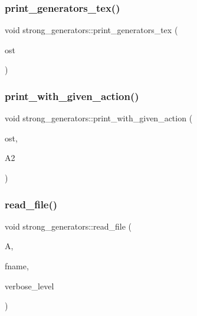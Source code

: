 \mbox{\label{classstrong__generators_ae4d81315ba881e7adb846b079fa9f0d8}} 
\subsubsection{\texorpdfstring{print\+\_\+generators\+\_\+tex()}{print\_generators\_tex()}\hspace{0.1cm}{\footnotesize\ttfamily [2/2]}}
{\footnotesize\ttfamily void strong\+\_\+generators\+::print\+\_\+generators\+\_\+tex (\begin{DoxyParamCaption}\item[{ostream \&}]{ost }\end{DoxyParamCaption})}

\mbox{\label{classstrong__generators_a6f470676cb12740c515471ed98e7f0de}} 
\subsubsection{\texorpdfstring{print\+\_\+with\+\_\+given\+\_\+action()}{print\_with\_given\_action()}}
{\footnotesize\ttfamily void strong\+\_\+generators\+::print\+\_\+with\+\_\+given\+\_\+action (\begin{DoxyParamCaption}\item[{ostream \&}]{ost,  }\item[{\mbox{\hyperlink{classaction}{action}} $\ast$}]{A2 }\end{DoxyParamCaption})}

\mbox{\label{classstrong__generators_ab051e503d66f5287ea59d5bf2e75fa3b}} 
\subsubsection{\texorpdfstring{read\+\_\+file()}{read\_file()}}
{\footnotesize\ttfamily void strong\+\_\+generators\+::read\+\_\+file (\begin{DoxyParamCaption}\item[{\mbox{\hyperlink{classaction}{action}} $\ast$}]{A,  }\item[{const \mbox{\hyperlink{galois_8h_ab6cc7b4aeb6ea31aba2b3fbfc83ff5e6}{B\+Y\+TE}} $\ast$}]{fname,  }\item[{\mbox{\hyperlink{galois_8h_a09fddde158a3a20bd2dcadb609de11dc}{I\+NT}}}]{verbose\+\_\+level }\end{DoxyParamCaption})}

